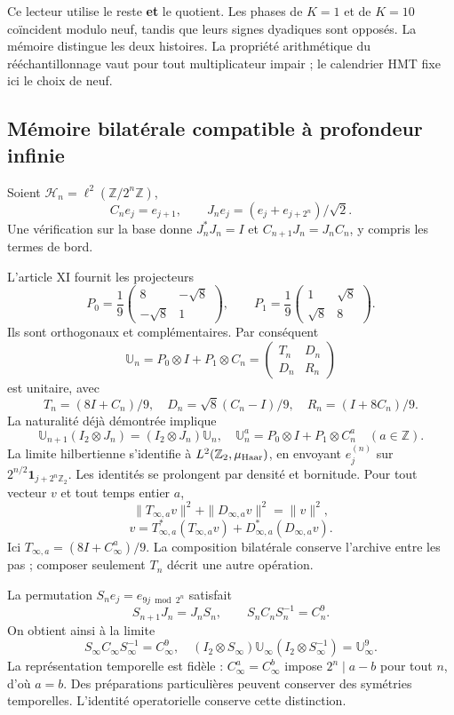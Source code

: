Ce lecteur utilise le reste \textbf{et} le quotient. Les phases de \(K=1\) et de \(K=10\) coïncident modulo neuf, tandis que leurs signes dyadiques sont opposés. La mémoire distingue les deux histoires. La propriété arithmétique du rééchantillonnage vaut pour tout multiplicateur impair ; le calendrier HMT fixe ici le choix de neuf.


\subsection{Mémoire bilatérale compatible à profondeur infinie}
\label{hmtfg:prolongacion:5}

Soient \(\mathcal H_n=\ell^2(\mathbb Z/2^n\mathbb Z)\),
\[
C_ne_j=e_{j+1},\qquad
J_ne_j=(e_j+e_{j+2^n})/\sqrt2.
\]
Une vérification sur la base donne \(J_n^*J_n=I\) et \(C_{n+1}J_n=J_nC_n\), y compris les termes de bord.

L’article XI fournit les projecteurs
\[
P_0=\frac19\begin{pmatrix}8&-\sqrt8\\-\sqrt8&1\end{pmatrix},\qquad
P_1=\frac19\begin{pmatrix}1&\sqrt8\\\sqrt8&8\end{pmatrix}.
\]
Ils sont orthogonaux et complémentaires. Par conséquent
\[
\mathbb U_n=P_0\otimes I+P_1\otimes C_n
=\begin{pmatrix}T_n&D_n\\D_n&R_n\end{pmatrix}
\]
est unitaire, avec
\[
T_n=(8I+C_n)/9,\quad D_n=\sqrt8(C_n-I)/9,\quad R_n=(I+8C_n)/9.
\]
La naturalité déjà démontrée implique
\[
\mathbb U_{n+1}(I_2\otimes J_n)=(I_2\otimes J_n)\mathbb U_n,
\quad \mathbb U_n^a=P_0\otimes I+P_1\otimes C_n^a
\quad(a\in\mathbb Z).
\]
La limite hilbertienne s’identifie à \(L^2(\mathbb Z_2,\mu_{\rm Haar})\), en envoyant \(e_j^{(n)}\) sur \(2^{n/2}\mathbf1_{j+2^n\mathbb Z_2}\). Les identités se prolongent par densité et bornitude. Pour tout vecteur \(v\) et tout temps entier \(a\),
\[
\boxed{\|T_{\infty,a}v\|^2+\|D_{\infty,a}v\|^2=\|v\|^2,}
\]
\[
\boxed{v=T_{\infty,a}^*(T_{\infty,a}v)+D_{\infty,a}^*(D_{\infty,a}v).}
\]
Ici \(T_{\infty,a}=(8I+C_\infty^a)/9\). La composition bilatérale conserve l’archive entre les pas ; composer seulement \(T_n\) décrit une autre opération.

La permutation \(S_ne_j=e_{9j\bmod2^n}\) satisfait
\[
S_{n+1}J_n=J_nS_n,\qquad S_nC_nS_n^{-1}=C_n^9.
\]
On obtient ainsi à la limite
\[
S_\infty C_\infty S_\infty^{-1}=C_\infty^9,
\quad (I_2\otimes S_\infty)\mathbb U_\infty
(I_2\otimes S_\infty^{-1})=\mathbb U_\infty^9.
\]
La représentation temporelle est fidèle : \(C_\infty^a=C_\infty^b\) impose \(2^n\mid a-b\) pour tout \(n\), d’où \(a=b\). Des préparations particulières peuvent conserver des symétries temporelles. L’identité operatorielle conserve cette distinction.


